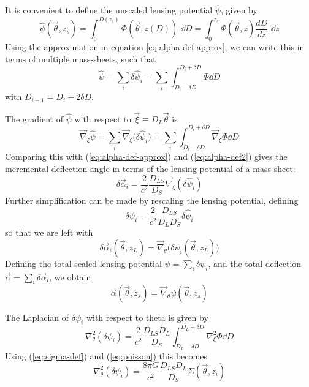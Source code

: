 It is convenient to define the unscaled lensing potential $\hat{\psi}$, 
given by
\begin{equation}
  \hat{\psi}(\vec{\theta},z_s) 
  = \int_{0}^{D(z_s)} \Phi(\vec{\theta},z(D))\,\,\dd D 
  = \int_{0}^{z_s}\Phi(\vec{\theta},z)\frac{dD}{dz}\,\,\dd z
\end{equation}
Using the approximation in equation \ref{eq:alpha-def-approx}, we can write this in terms of multiple mass-sheets, such that
\begin{equation}
  \hat{\psi} = \sum_i \delta \hat{\psi}_i 
  = \sum_i \int_{D_i-\delta D}^{D_i+\delta D}\Phi \dd D
\end{equation}
with $D_{i+1} = D_i + 2\delta D$.

The gradient of $\hat{\psi}$ with respect to 
$\vec{\xi} \equiv D_L\vec{\theta}$ is
\begin{equation}
  \vec{\nabla}_\xi\hat{\psi} 
  = \sum_i \vec{\nabla}_\xi\big(\delta\hat{\psi}_i\big) 
  = \sum_i \int_{D_i - \delta D}^{D_i+\delta D}\vec{\nabla}_\xi \Phi \dd D
\end{equation}
Comparing this with (\ref{eq:alpha-def-approx}) and (\ref{eq:alpha-def2}) gives the incremental deflection angle in terms of the lensing potential of a mass-sheet:
\begin{equation}
  \delta\vec{\alpha}_i = \frac{2}{c^2}\frac{D_{LS}}{D_S}\vec{\nabla}_\xi (\delta\hat{\psi}_i)
\end{equation}
Further simplification can be made by rescaling the lensing potential,
defining
\begin{equation}
  \delta\psi_i = \frac{2}{c^2}\frac{D_{LS}}{D_L D_S} \delta\hat{\psi}_i
\end{equation}
so that we are left with
\begin{equation}
  \label{eq:alpha-psi}
  \delta\vec{\alpha}_i(\vec{\theta},z_L) = \vec{\nabla}_\theta \Big( \delta\psi_i(\vec{\theta},z_L)\Big)
\end{equation}
Defining the total scaled lensing potential $\psi = \sum_i \delta\psi_i$, and the total deflection $\vec{\alpha} = \sum_i\delta\vec{\alpha}_i$, we obtain
\begin{equation}
  \vec{\alpha}(\vec{\theta},z_s) = \vec{\nabla}_\theta \psi(\vec{\theta},z_s)
\end{equation}

The Laplacian of $\delta\psi_i$ with respect to theta is given by
\begin{equation}
  \nabla_\theta^2 (\delta\psi_i) 
  = \frac{2}{c^2}\frac{D_{LS}D_L}{D_S}\int_{D_L-\delta D}^{D_L+\delta D} 
  \nabla_\xi^2\Phi \dd D
\end{equation}
Using (\ref{eq:sigma-def}) and (\ref{eq:poisson}) this becomes
\begin{equation}
  \label{eq:psi-sigma_init}
  \nabla_\theta^2(\delta\psi_i) = \frac{8\pi G}{c^2}\frac{D_{LS}D_L}{D_S}\Sigma(\vec{\theta},z_i)
\end{equation}

